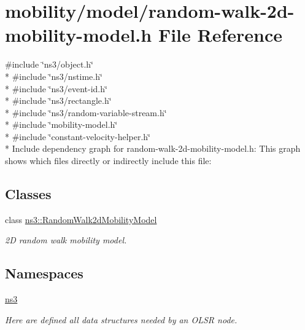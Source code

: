 \hypertarget{random-walk-2d-mobility-model_8h}{}\section{mobility/model/random-\/walk-\/2d-\/mobility-\/model.h File Reference}
\label{random-walk-2d-mobility-model_8h}
{\ttfamily \#include \char`\"{}ns3/object.\+h\char`\"{}}\\*
{\ttfamily \#include \char`\"{}ns3/nstime.\+h\char`\"{}}\\*
{\ttfamily \#include \char`\"{}ns3/event-\/id.\+h\char`\"{}}\\*
{\ttfamily \#include \char`\"{}ns3/rectangle.\+h\char`\"{}}\\*
{\ttfamily \#include \char`\"{}ns3/random-\/variable-\/stream.\+h\char`\"{}}\\*
{\ttfamily \#include \char`\"{}mobility-\/model.\+h\char`\"{}}\\*
{\ttfamily \#include \char`\"{}constant-\/velocity-\/helper.\+h\char`\"{}}\\*
Include dependency graph for random-\/walk-\/2d-\/mobility-\/model.h\+:
This graph shows which files directly or indirectly include this file\+:
\subsection*{Classes}
\begin{DoxyCompactItemize}
\item 
class \hyperlink{classns3_1_1RandomWalk2dMobilityModel}{ns3\+::\+Random\+Walk2d\+Mobility\+Model}
\begin{DoxyCompactList}\small\item\em 2D random walk mobility model. \end{DoxyCompactList}\end{DoxyCompactItemize}
\subsection*{Namespaces}
\begin{DoxyCompactItemize}
\item 
 \hyperlink{namespacens3}{ns3}
\begin{DoxyCompactList}\small\item\em Here are defined all data structures needed by an O\+L\+SR node. \end{DoxyCompactList}\end{DoxyCompactItemize}
